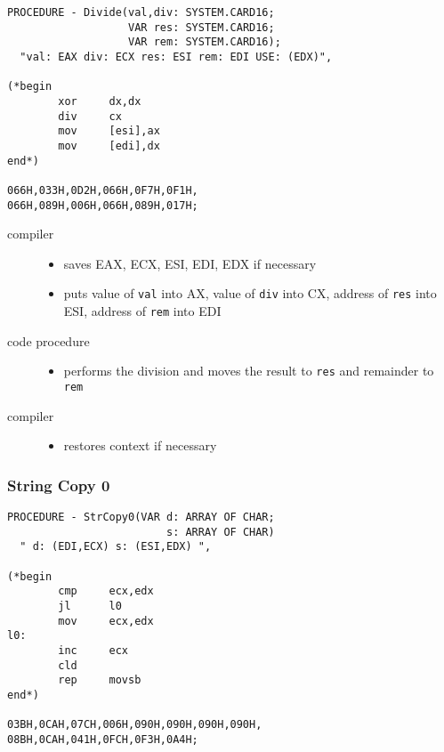 \begin{verbatim}
PROCEDURE - Divide(val,div: SYSTEM.CARD16;
                   VAR res: SYSTEM.CARD16;
                   VAR rem: SYSTEM.CARD16);
  "val: EAX div: ECX res: ESI rem: EDI USE: (EDX)",

(*begin
        xor     dx,dx
        div     cx
        mov     [esi],ax
        mov     [edi],dx
end*)

066H,033H,0D2H,066H,0F7H,0F1H,
066H,089H,006H,066H,089H,017H;
\end{verbatim}

\begin{description}
\item[compiler] \mbox{}
   \begin{itemize}
     \item saves EAX, ECX, ESI, EDI, EDX if necessary
     \item puts value of {\tt val} into AX, value of {\tt div} into CX,
           address of {\tt res} into ESI, address of {\tt rem} into EDI
   \end{itemize}
\item[code procedure] \mbox{}
   \begin{itemize}
   \item performs the division and moves the result to {\tt res}
         and remainder to {\tt rem}
   \end{itemize}
\item[compiler] \mbox{}
   \begin{itemize}
   \item  restores context if necessary
   \end{itemize}
\end{description}

\subsubsection{String Copy 0}\label{StrCopy0}

\begin{verbatim}
PROCEDURE - StrCopy0(VAR d: ARRAY OF CHAR;
                         s: ARRAY OF CHAR)
  " d: (EDI,ECX) s: (ESI,EDX) ",

(*begin
        cmp     ecx,edx
        jl      l0
        mov     ecx,edx
l0:
        inc     ecx
        cld
        rep     movsb
end*)

03BH,0CAH,07CH,006H,090H,090H,090H,090H,
08BH,0CAH,041H,0FCH,0F3H,0A4H;
\end{verbatim}

